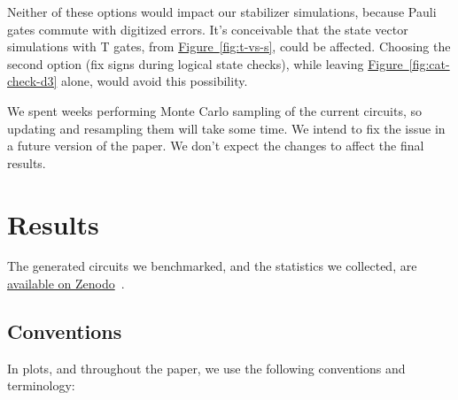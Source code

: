 \documentclass[onecolumn,unpublished,a4paper]{quantumarticle}
\theoremstyle{definition}
\newcommand{\fig}[1]{\hyperref[fig:#1]{Figure~\ref*{fig:#1}}}
\begin{document}
Neither of these options would impact our stabilizer simulations, because Pauli gates commute with digitized errors.
It's conceivable that the state vector simulations with T gates, from \fig{t-vs-s}, could be affected.
Choosing the second option (fix signs during logical state checks), while leaving \fig{cat-check-d3} alone, would avoid this possibility.

We spent weeks performing Monte Carlo sampling of the current circuits, so updating and resampling them will take some time.
We intend to fix the issue in a future version of the paper.
We don't expect the changes to affect the final results.


\section{Results}
\label{sec:results}

The generated circuits we benchmarked, and the statistics we collected, are \href{https://doi.org/10.5281/zenodo.13777072}{available on Zenodo}~\cite{gidneyy2024cultivationdata}.

\subsection{Conventions}

In plots, and throughout the paper, we use the following conventions and terminology:
\end{document}
